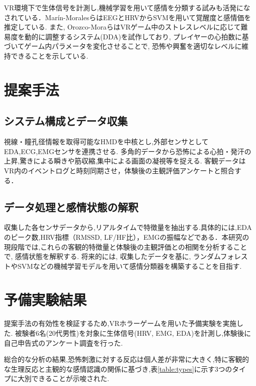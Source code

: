 \documentclass[a4paper]{jlreq}
\begin{document}
VR環境下で生体信号を計測し,機械学習を用いて感情を分類する試みも活発になされている．Marín-Moralesら\cite{Marin-Morales2018}はEEGとHRVからSVMを用いて覚醒度と感情価を推定している. また, Orozco-Moraら\cite{Orozco-Mora2024}はVRゲーム中のストレスレベルに応じて難易度を動的に調整するシステム(DDA)を試作しており, プレイヤーの心拍数に基づいてゲーム内パラメータを変化させることで, 恐怖や興奮を適切なレベルに維持できることを示している.

\section{提案手法}

\subsection{システム構成とデータ収集}

視線・瞳孔径情報を取得可能なHMDを中核とし,外部センサとしてEDA,ECG,EMGセンサを連携させる. 多角的データから恐怖による心拍・発汗の上昇,驚きによる瞬きや筋収縮,集中による画面の凝視等を捉える. 客観データはVR内のイベントログと時刻同期させ，体験後の主観評価アンケートと照合する．

\subsection{データ処理と感情状態の解釈}

収集した各センサデータから,リアルタイムで特徴量を抽出する.具体的には,EDAのピーク数,HRV指標（RMSSD, LF/HF比），EMGの振幅などである．本研究の現段階では,これらの客観的特徴量と体験後の主観評価との相関を分析することで, 感情状態を解釈する. 将来的には, 収集したデータを基に, ランダムフォレストやSVMなどの機械学習モデルを用いて感情分類器を構築することを目指す.

\section{予備実験結果}

提案手法の有効性を検証するため,VRホラーゲームを用いた予備実験を実施した. 被験者6名(20代男性)を対象に生体信号(HRV, EMG, EDA)を計測し,体験後に自己申告式のアンケート調査を行った.

総合的な分析の結果,恐怖刺激に対する反応は個人差が非常に大きく,特に客観的な生理反応と主観的な感情認識の関係に基づき,表\ref{table:types}に示す3つのタイプに大別できることが示唆された.
\end{document}
